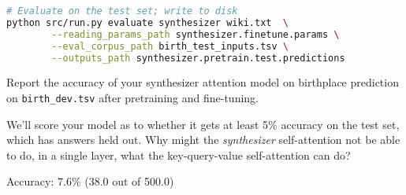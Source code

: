 \begin{parts}
\begin{lstlisting}[basicstyle=\ttfamily, language=bash]
# Evaluate on the test set; write to disk
python src/run.py evaluate synthesizer wiki.txt  \
        --reading_params_path synthesizer.finetune.params \
        --eval_corpus_path birth_test_inputs.tsv \
        --outputs_path synthesizer.pretrain.test.predictions
    \end{lstlisting}

    Report the accuracy of your synthesizer attention model on birthplace prediction on \texttt{birth\_dev.tsv} after pretraining and fine-tuning.

    \begin{subparts}
        \subpart[8]  We'll score your model as to whether it gets at least 5\% accuracy on the test set, which has answers held out.
        \subpart[2] Why might the \textit{synthesizer} self-attention not be able to do, in a single layer, what the key-query-value self-attention can do?

        \begin{answer}
            Accuracy: $7.6\%$ (38.0 out of 500.0)
        \end{answer}

    \end{subparts}
\end{parts}

